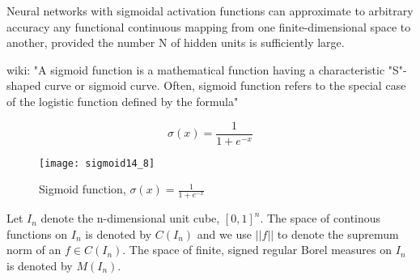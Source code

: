 \documentclass[]{article}
\theoremstyle{definition}
\begin{document}
\begin{center}

\end{center}


Neural networks with sigmoidal activation functions can approximate to arbitrary accuracy any functional continuous mapping from one finite-dimensional space to another, provided the number N of hidden units is sufficiently large.

		

wiki: "A sigmoid function is a mathematical function having a characteristic "S"-shaped curve or sigmoid curve. Often, sigmoid function refers to the special case of the logistic function defined by the formula"

$$
\sigma(x) = \frac{1}{1+e^{-x}}
$$



\begin{figure}[h]
	\centering
	\texttt{[image: sigmoid14\_8]}
	\caption{Sigmoid function, $\sigma(x) = \frac{1}{1+e^{-x}}$}
\end{figure}

\newpage

Let $I_n$ denote the n-dimensional unit cube, $[0,1]^n$. The space of continous functions on $I_n$ is denoted by $C(I_n)$ and we use $||f||$ to denote the supremum norm of an $f \in C(I_n)$. The space of finite, signed regular Borel measures on $I_n$ is denoted by $M(I_n)$.
\end{document}
